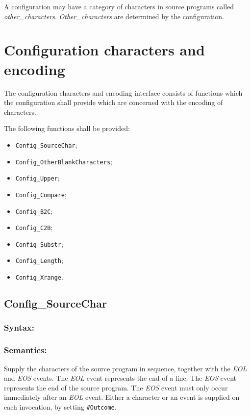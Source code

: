 A configuration may have a category of characters in source programs
called \emph{other\_characters}. \emph{Other\_characters} are determined
by the configuration.

\section{Configuration characters and
encoding}\label{configuration-characters-and-encoding}

The configuration characters and encoding interface consists of
functions which the configuration shall provide which are concerned with
the encoding of characters.

The following functions shall be provided:

\begin{itemize}
\tightlist
\item
  \texttt{Config\_SourceChar};
\item
  \texttt{Config\_OtherBlankCharacters};
\item
  \texttt{Config\_Upper};
\item
  \texttt{Config\_Compare};
\item
  \texttt{Config\_B2C};
\item
  \texttt{Config\_C2B};
\item
  \texttt{Config\_Substr};
\item
  \texttt{Config\_Length};
\item
  \texttt{Config\_Xrange}.
\end{itemize}

\subsection{Config\_SourceChar}\label{config_sourcechar}

\subsubsection{Syntax:}\label{syntax}



\subsubsection{Semantics:}\label{semantics-1}

Supply the characters of the source program in sequence, together with
the \emph{EOL} and \emph{EOS} events. The \emph{EOL} event represents
the end of a line. The \emph{EOS} event represents the end of the source
program. The \emph{EOS} event must only occur immediately after an
\emph{EOL} event. Either a character or an event is supplied on each
invocation, by setting \texttt{\#Outcome}.

